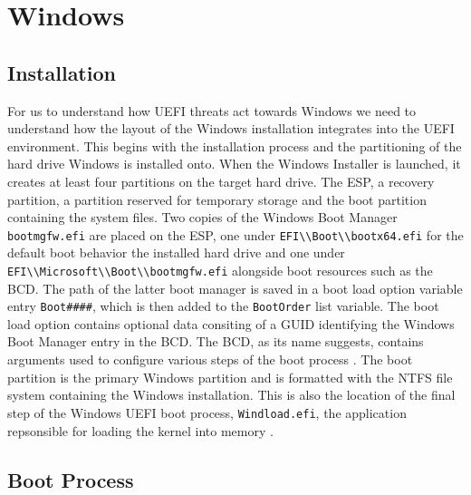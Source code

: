 
\section{Windows}



\subsection{Installation}

For us to understand how UEFI threats act towards Windows we need to understand how the layout of the Windows installation integrates into the UEFI environment.
This begins with the installation process and the partitioning of the hard drive Windows is installed onto.
When the Windows Installer is launched, it creates at least four partitions on the target hard drive.
The \acf{ESP}, a recovery partition, a partition reserved for temporary storage and the boot partition containing the system files.
Two copies of the Windows Boot Manager \lstinline{bootmgfw.efi} are placed on the \ac{ESP}, one under \lstinline{EFI\\Boot\\bootx64.efi} for the default boot behavior the installed hard drive and one under \lstinline{EFI\\Microsoft\\Boot\\bootmgfw.efi} alongside boot resources such as the \ac{BCD}. The path of the latter boot manager is saved in a boot load option variable entry \lstinline{Boot####}, which is then added to the \lstinline{BootOrder} list variable. The boot load option contains optional data consiting of a GUID identifying the Windows Boot Manager entry in the \ac{BCD}. The \ac{BCD}, as its name suggests, contains arguments used to configure various steps of the boot process \cite[12. The Windows Boot Manager]{windows-internals-7-part2}. The boot partition is the primary Windows partition and is formatted with the \ac{NTFS} file system containing the Windows installation. This is also the location of the final step of the Windows UEFI boot process, \lstinline{Windload.efi}, the application repsonsible for loading the kernel into memory \cite[12. The Windows OS Loader]{windows-internals-7-part2}.

\subsection{Boot Process}

